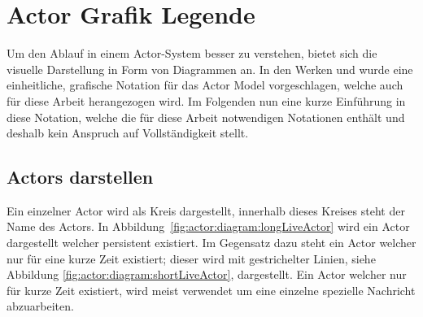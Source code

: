 \section{Actor Grafik Legende}\label{actor:diagram:description}
Um den Ablauf in einem Actor-System besser zu verstehen, bietet sich die visuelle Darstellung in Form von Diagrammen an. In den Werken \cite{kuhn2017reactive} und \cite{Vernon2015ReactiveAkka} wurde eine einheitliche, grafische Notation für das Actor Model vorgeschlagen, welche auch für diese Arbeit herangezogen wird. Im Folgenden nun eine kurze Einführung in diese Notation, welche die für diese Arbeit notwendigen Notationen enthält und deshalb kein Anspruch auf Vollständigkeit stellt.\\
\subsection{Actors darstellen}
Ein einzelner Actor wird als Kreis dargestellt, innerhalb dieses Kreises steht der Name des Actors. In Abbildung~\ref{fig:actor:diagram:longLiveActor} wird ein Actor dargestellt welcher persistent existiert. Im Gegensatz dazu steht ein Actor welcher nur für eine kurze Zeit existiert; dieser wird mit gestrichelter Linien, siehe Abbildung \ref{fig:actor:diagram:shortLiveActor}, dargestellt. Ein Actor welcher nur für kurze Zeit existiert, wird meist verwendet um eine einzelne spezielle Nachricht abzuarbeiten.  
